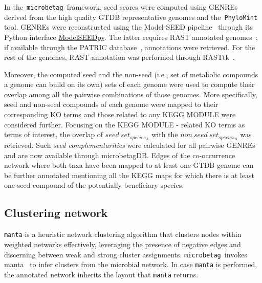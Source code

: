 \documentclass[sn-mathphys,Numbered]{sn-jnl}  %
\theoremstyle{thmstyleone}%
\theoremstyle{thmstyletwo}%
\theoremstyle{thmstylethree}%
\newcommand{\microbetag}{\texttt{microbetag }}
\begin{document}
        In the~\microbetag framework, seed scores were computed using GENREs derived from the high quality GTDB representative genomes and the~\texttt{PhyloMint} tool.
        GENREs were reconstructed using the Model SEED pipeline~\cite{henry2010high} through its Python interface \href{https://modelseedpy.readthedocs.io/en/latest/index.html}{ModelSEEDpy}.
        The latter requires RAST annotated genomes~\cite{overbeek2014seed}; 
        if available through the PATRIC database~\cite{wattam2017improvements}, annotations were retrieved.
        For the rest of the genomes, RAST annotation was performed through RASTtk~\cite{brettin2015rasttk}.

        Moreover, the computed seed and the non-seed (i.e., set of metabolic compounds a genome can build on its own) sets of each genome were used to compute their overlap among all the pairwise combinations of those genomes.
        More specifically, seed and non-seed compounds of each genome were mapped to their corresponding KO terms and those related to any KEGG MODULE were considered further.
        Focusing on the KEGG MODULE - related KO terms as terms of interest, the overlap of ${seed\ set}_{species_A}$ with the ${non\ seed\ set}_{species_B}$ was retrieved.
        Such \textit{seed complementarities} were calculated for all pairwise GENREs and are now available through microbetagDB.
        Edges of the co-occurrence network where both taxa have been mapped to at least one GTDB genome can be further annotated mentioning all the KEGG maps for which there is at least one seed compound of the potentially beneficiary species. 



    \subsection*{Clustering network}
    \label{subsec:manta}

        \texttt{manta} is a heuristic network clustering algorithm that clusters nodes within weighted networks effectively, leveraging the presence of negative edges and discerning between weak and strong cluster assignments.
        \microbetag invokes manta~\cite{rottjers2020manta} to infer clusters from the microbial network.
        In case \texttt{manta} is performed, the annotated network inherits the layout that \texttt{manta} returns.
\end{document}
